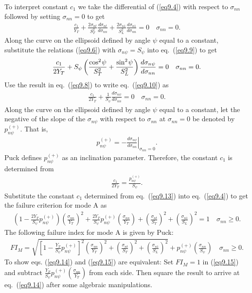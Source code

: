 \documentclass{AeroStructure-ERJohnson}
\begin{document}
To interpret constant $c_1$ we take the differential of (\ref{eq9.4}) with respect to $\sigma_\textit{nn}$ followed by setting $\sigma_\textit{nn} = 0$ to get
\begin{align}\label{eq9.9}
\frac{c_{1}}{Y_{T}}+\frac{2 \sigma_{n t}}{S_{T}^{2}} \frac{d \dot{\sigma}_{n t}}{d \sigma_{n n}}+\frac{2 \sigma_{n 1}}{S_{L}^{2}} \frac{d \sigma_{n 1}}{d \sigma_{n n}}=0 \quad \sigma_{n n}=0.
\end{align}
Along the curve on the ellipsoid defined by angle $\psi$ equal to a constant, substitute the relations (\ref{eq9.6}) with $\sigma_{n \psi}=S_{\psi}$ into eq.~(\ref{eq9.9}) to get
\begin{align}\label{eq9.10}
\frac{c_{1}}{2 Y_{T}}+S_{\psi}\left(\frac{\cos ^{2}{\kern-1pt\psi}}{S_{T}^{2}}+\frac{\sin ^{2}{\kern-1pt\psi}}{S_{L}^{2}}\right) \frac{d \sigma_{n \psi}}{d \sigma_{n n}}=0 \quad \sigma_{n n}=0.
\end{align}
Use the result in eq.~(\ref{eq9.8}) to write eq.~(\ref{eq9.10}) as
\begin{align}\label{eq9.11}
\frac{c_{1}}{2 Y_{T}}+\frac{1}{S_{\psi}} \frac{d \sigma_{n \psi}}{d \sigma_{n n}}=0 \quad \sigma_{n n}=0.
\end{align}
Along the curve on the ellipsoid defined by angle $\psi$ equal to a constant, let the negative of the slope of the $\sigma_{n \psi}$ with respect to $\sigma_\textit{nn}$ at $\sigma_\textit{nn} = 0$ be denoted by $p_{n\psi}^{(+)}$. That is,
\begin{align}\label{eq9.12}
p_{n \psi}^{(+)}=-\left.\frac{d \sigma_{n \psi}}{d \sigma_{n n}}\right|_{\sigma_{n n}=0}.
\end{align}
Puck defines $p_{n \psi}^{(+)}$ as an inclination parameter. Therefore, the constant $c_1$ is determined from
\begin{align}\label{eq9.13}
\frac{c_{1}}{2 Y_{T}}=\frac{p_{n \psi}^{(+)}}{S_{\psi}}.
\end{align}
Substitute the constant $c_1$ determined from eq.~(\ref{eq9.13}) into eq.~(\ref{eq9.4}) to get the failure criterion for mode A as
\begin{align}\label{eq9.14}
\left(1-\frac{2 Y_{T}}{S_{\psi}} p_{n \psi}^{(+)}\right)\left(\frac{\sigma_{n n}}{Y_{T}}\right)^{2}+\frac{2 Y_{T}}{S_{\psi}} p_{n \psi}^{(+)}\left(\frac{\sigma_{n n}}{Y_{T}}\right)+\left(\frac{\sigma_{n t}}{S_{T}}\right)^{2}+\left(\frac{\sigma_{n 1}}{S_{L}}\right)^{2}=1 \quad \sigma_{n n} \geq 0.
\end{align}
The following failure index for mode A is given by Puck:
\begin{align}\label{eq9.15}
F I_{M}=\sqrt{\left[1-\frac{Y_{T}}{S_{\psi}} p_{n \psi}^{(+)}\right]^{2}\left(\frac{\sigma_{n n}}{Y_{T}}\right)^{2}+\left(\frac{\sigma_{n t}}{S_{T}}\right)^{2}+\left(\frac{\sigma_{n 1}}{S_{L}}\right)^{2}}+p_{n \psi}^{(+)}\left(\frac{\sigma_{n n}}{S_{\psi}}\right) \quad \sigma_{n n} \geq 0.
\end{align}
To show eqs. (\ref{eq9.14}) and (\ref{eq9.15}) are equivalent: Set $F I_{M}=1$ in (\ref{eq9.15}) and subtract $\frac{Y_{T}}{S_{\psi}} p_{n \psi}^{(+)}\left(\frac{\sigma_{n n}}{Y_{T}}\right)$ from each side. Then square the result to arrive at eq.~(\ref{eq9.14}) after some algebraic manipulations.
\end{document}
